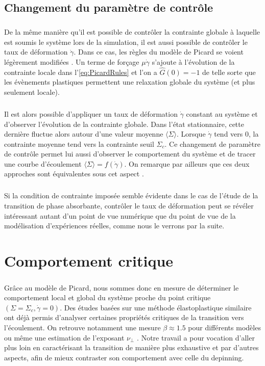 \subsection{Changement du paramètre de contrôle}

\subparagraph{}De la même manière qu'il est possible de contrôler la contrainte globale à laquelle est soumis le système lors de la simulation, il est aussi possible de contrôler le taux de déformation $\dot{\gamma}$. Dans ce cas, les règles du modèle de Picard se voient légèrement modifiées \cite{picard_slow_2005}. Un terme de forçage $\mu\dot{\gamma}$ s'ajoute à l'évolution de la contrainte locale dans l'\autoref{eq:PicardRules} et l'on a $\hat{G}(0) = -1$ de telle sorte que les évènements plastiques permettent une relaxation globale du système (et plus seulement locale).

\subparagraph{}Il est alors possible d'appliquer un taux de déformation $\dot{\gamma}$ constant au système et d'observer l'évolution de la contrainte globale. Dans l'état stationnaire, cette dernière fluctue alors autour d'une valeur moyenne $\langle \Sigma\rangle$. Lorsque $\dot{\gamma}$ tend vers $0$, la contrainte moyenne tend vers la contrainte seuil $\Sigma_c$. Ce changement de paramètre de contrôle permet lui aussi d'observer le comportement du système et de tracer une courbe d'écoulement $\langle \Sigma \rangle = f(\dot{\gamma})$. On remarque par ailleurs que ces deux approches sont équivalentes sous cet aspect \cite{liu_driving_2016}.

\subparagraph{}Si la condition de contrainte imposée semble évidente dans le cas de l'étude de la transition de phase absorbante, contrôler le taux de déformation peut se révéler intéressant autant d'un point de vue numérique que du point de vue de la modélisation d'expériences réelles, comme nous le verrons par la suite.

\section{Comportement critique}

\subparagraph{}Grâce au modèle de Picard, nous sommes donc en mesure de déterminer le comportement local et global du système proche du point critique $(\Sigma = \Sigma_c, \dot{\gamma} = 0)$. Des études basées sur une méthode élastoplastique similaire ont déjà permis d'analyser certaines propriétés critiques de la transition vers l'écoulement. On retrouve notamment une mesure $\beta\approx 1.5$ pour différents modèles \cite{lin_scaling_2014, liu_driving_2016, ferrero_criticality_2019} ou même une estimation de l'exposant $\nu_\perp$ \cite{lin_scaling_2014}. Notre travail a pour vocation d'aller plus loin en caractérisant la transition de manière plus exhaustive et par d'autres aspects, afin de mieux contraster son comportement avec celle du depinning. 

